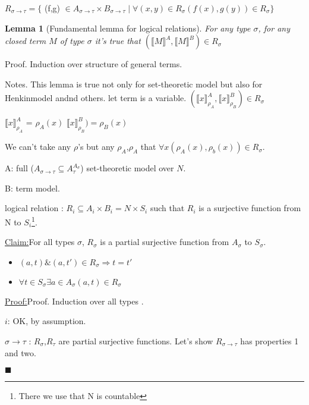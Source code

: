 \documentclass[a4paper,10pt]{book}
\newtheorem{lemma}{Lemma}
\newcommand{\sem}[2]{ \llbracket#1\rrbracket_{#2} }
\newenvironment{claim}[1]{\par\noindent\underline{Claim:}\space#1}{}
\newenvironment{claimproof}[1]{\par\noindent\underline{Proof:}\space#1}{\hfill $\blacksquare$}
\begin{document}
$R_{\sigma \rightarrow  \tau} = \{$ (f,g) $\in A_{\sigma \rightarrow \tau} \times
B_{\sigma \rightarrow \tau} \mid
\forall (x,y) \in R_\sigma (f(x), g(y)) \in R_\sigma \}$

\begin{lemma}[Fundamental lemma for logical relations]
For any type $\sigma$, for any closed term $M$ of type $\sigma$ it's true that 
$(\sem{M}{} ^A, \sem{M}{} ^B) \in R_\sigma$ 
\end{lemma}



Proof. Induction over structure of general terms.

Notes. This lemma is true not only for set-theoretic model but also for Henkinmodel andnd
others.
let term is a variable. $(\sem{x}{\rho_A}^A, \sem{x}{\rho_B}^B) \in R_\sigma$

$\sem{x}{\rho_A}^A$ = $\rho_A(x)$
$\sem{x}{\rho_B}^B) = \rho_B(x)$

We can't take any $\rho$'s but any $\rho_A$,$\rho_A$ that $\forall x (\rho_A(x), \rho_b(x)) \in R_\sigma$.


A: full ($A_{\sigma \rightarrow \tau} \subseteq A_{\tau}^{A_\sigma}$) set-theoretic model over $N$.

B: term model.

logical relation : $R_i \subseteq A_i \times B_i = N \times S_i$ such that $R_i$ is a surjective 
function from N to $S_i$\footnote{There we use that N is countable}.

\begin{claim}
For all types $\sigma$, $R_\sigma$ is a partial surjective function from $A_\sigma$ to $S_\sigma$.
 
\begin{itemize}
 \item $(a,t) \& (a,t') \in R_\sigma \Rightarrow t = t'$
 \item $\forall t \in S_\sigma \exists a  \in A_\sigma (a,t) \in R_\sigma$
\end{itemize}
\end{claim}

\begin{claimproof}
 

Proof. Induction over all types .

$i$: OK, by assumption.

$\sigma \rightarrow \tau$ : $R_\sigma$,$R_\tau$ are partial surjective functions. Let's show 
$R_{\sigma \rightarrow \tau}$ has properties 1 and two.

\end{claimproof}
\end{document}
